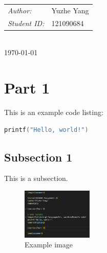 \documentclass[12pt,a4paper]{report}
\begin{document}
\begin{titlepage}
    \begin{minipage}{0.4\textwidth}
        \begin{tabular}{l l}
            \emph{Author:\quad}     & Yuzhe Yang \\
            \emph{Student ID:\quad} & 121090684  \\
        \end{tabular}

    \end{minipage}\\[2cm]


    {\large \today}\\[2cm]
    \vfill
\end{titlepage}


\tableofcontents
\newpage


\section{Part 1}

This is an example code listing:

\begin{lstlisting}[language=C++, caption=Example C++ code]
printf("Hello, world!")
\end{lstlisting}

\subsection{Subsection 1}
This is a subsection.

\begin{figure}[h]
    \centering
    \includegraphics[width=0.3\textwidth]{src/example.png}
    \caption{Example image}
\end{figure}
\end{document}
